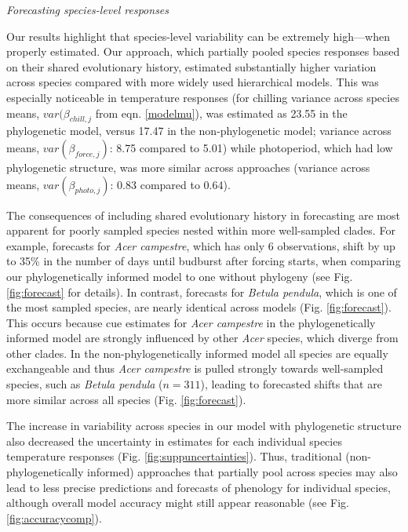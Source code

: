 \documentclass[11pt]{article}
\begin{document}
\emph{Forecasting species-level responses}

Our results highlight that species-level variability can be extremely high---when properly estimated. Our approach, which partially pooled species responses based on their shared evolutionary history, estimated substantially higher variation across species compared with more widely used hierarchical models. This was especially noticeable in temperature responses (for chilling variance across species means, $var(\beta_{chill,j}$ from eqn. \ref{modelmu}), was estimated as 23.55 in the phylogenetic model, versus 17.47 in the non-phylogenetic model; variance across means, $var(\beta_{force,j})$: 8.75 compared to 5.01) while photoperiod, which had low phylogenetic structure, was more similar across approaches (variance across means, $var(\beta_{photo,j})$: 0.83 compared to 0.64). %

The consequences of including shared evolutionary history in forecasting are most apparent for poorly sampled species nested within more well-sampled clades. For example, forecasts for \emph{Acer campestre}, which has only 6 observations, shift by up to 35\% in the number of days until budburst after forcing starts, when comparing our phylogenetically informed model to one without phylogeny (see Fig. \ref{fig:forecast} for details). In contrast, forecasts for \emph{Betula pendula}, which is one of the most sampled species, are nearly identical across models (Fig. \ref{fig:forecast}). This occurs because cue estimates for \emph{Acer campestre} in the phylogenetically informed model are strongly influenced by other \emph{Acer} species, which diverge from other clades. In the non-phylogenetically informed model all species are equally exchangeable and thus \emph{Acer campestre} is pulled strongly towards well-sampled species, such as \emph{Betula pendula} ($n = 311$), leading to forecasted shifts that are more similar across all species (Fig. \ref{fig:forecast}). 

The increase in variability across species in our model with phylogenetic structure also decreased the uncertainty in estimates for each individual species temperature responses (Fig. \ref{fig:suppuncertainties}). Thus, traditional (non-phylogenetically informed) approaches that partially pool across species  \cite[most hierarchical models in ecology, e.g.,][]{flynn2018,ettinger2020} may also lead to less precise predictions and forecasts of phenology for individual species, although overall model accuracy might still appear reasonable (see Fig. \ref{fig:accuracycomp}).
\end{document}
